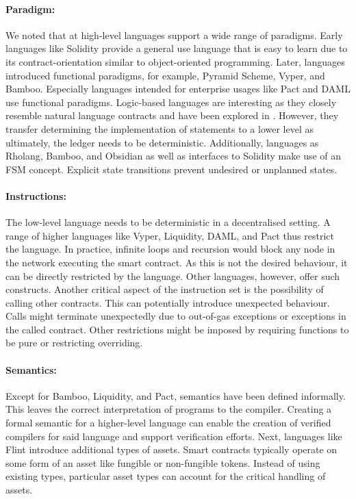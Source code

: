 \documentclass{llncs}
\begin{document}
\paragraph{Paradigm:} We noted that at high-level languages support a wide range of paradigms. 
Early languages like Solidity provide a general use language that is easy to learn due to its contract-orientation similar to object-oriented programming.
Later, languages introduced functional paradigms, for example, Pyramid Scheme, Vyper, and Bamboo.
Especially languages intended for enterprise usages like Pact and DAML use functional paradigms.
Logic-based languages are interesting as they closely resemble natural language contracts and have been explored in \cite{Idelberger2016}. However, they transfer determining the implementation of statements to a lower level as ultimately, the ledger needs to be deterministic.
Additionally, languages as Rholang, Bamboo, and Obsidian as well as interfaces to Solidity \cite{Mavridou2018} make use of an FSM concept. Explicit state transitions prevent undesired or unplanned states.


\paragraph{Instructions:} The low-level language needs to be deterministic in a decentralised setting.
A range of higher languages like Vyper, Liquidity, DAML, and Pact thus restrict the language. In practice, infinite loops and recursion would block any node in the network executing the smart contract. As this is not the desired behaviour, it can be directly restricted by the language. Other languages, however, offer such constructs.
Another critical aspect of the instruction set is the possibility of calling other contracts. This can potentially introduce unexpected behaviour. Calls might terminate unexpectedly due to out-of-gas exceptions or exceptions in the called contract. 
Other restrictions might be imposed by requiring functions to be pure or restricting overriding.

\paragraph{Semantics:} Except for Bamboo, Liquidity, and Pact, semantics have been defined informally. This leaves the correct interpretation of programs to the compiler. Creating a formal semantic for a higher-level language can enable the creation of verified compilers for said language and support verification efforts.
Next, languages like Flint introduce additional types of assets. Smart contracts typically operate on some form of an asset like fungible or non-fungible tokens. Instead of using existing types, particular asset types can account for the critical handling of assets.
\end{document}
